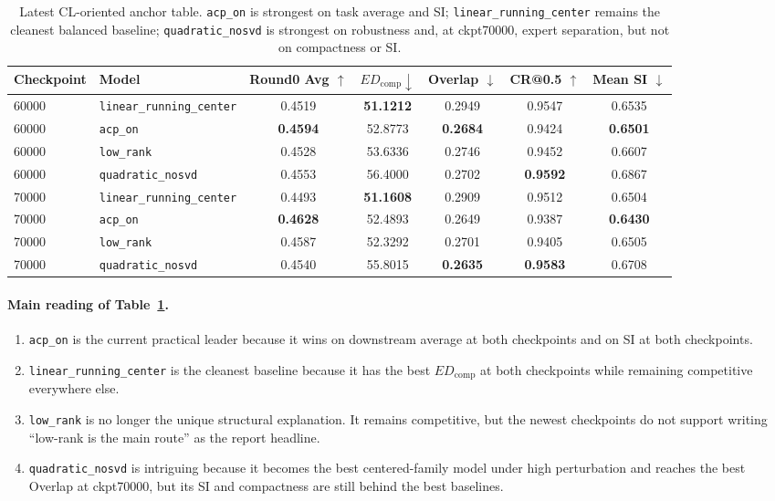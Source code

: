 \documentclass[11pt]{article}
\newcommand{\tablesize}{\footnotesize}
\begin{document}
\begin{table}[H]
\centering
\tablesize
\begin{adjustbox}{max width=\linewidth}
\begin{tabular}{llccccc}
\toprule
Checkpoint & Model & Round0 Avg $\uparrow$ & $ED_{\mathrm{comp}} \downarrow$ & Overlap $\downarrow$ & CR@0.5 $\uparrow$ & Mean SI $\downarrow$ \\
\midrule
60000 & \texttt{linear\_running\_center} & 0.4519 & \textbf{51.1212} & 0.2949 & 0.9547 & 0.6535 \\
60000 & \texttt{acp\_on} & \textbf{0.4594} & 52.8773 & \textbf{0.2684} & 0.9424 & \textbf{0.6501} \\
60000 & \texttt{low\_rank} & 0.4528 & 53.6336 & 0.2746 & 0.9452 & 0.6607 \\
60000 & \texttt{quadratic\_nosvd} & 0.4553 & 56.4000 & 0.2702 & \textbf{0.9592} & 0.6867 \\
\midrule
70000 & \texttt{linear\_running\_center} & 0.4493 & \textbf{51.1608} & 0.2909 & 0.9512 & 0.6504 \\
70000 & \texttt{acp\_on} & \textbf{0.4628} & 52.4893 & 0.2649 & 0.9387 & \textbf{0.6430} \\
70000 & \texttt{low\_rank} & 0.4587 & 52.3292 & 0.2701 & 0.9405 & 0.6505 \\
70000 & \texttt{quadratic\_nosvd} & 0.4540 & 55.8015 & \textbf{0.2635} & \textbf{0.9583} & 0.6708 \\
\bottomrule
\end{tabular}
\end{adjustbox}
\caption{Latest CL-oriented anchor table. \texttt{acp\_on} is strongest on task average and SI; \texttt{linear\_running\_center} remains the cleanest balanced baseline; \texttt{quadratic\_nosvd} is strongest on robustness and, at ckpt70000, expert separation, but not on compactness or SI.}
\label{tab:latest-anchor}
\end{table}

\paragraph{Main reading of Table~\ref{tab:latest-anchor}.}
\begin{enumerate}
    \item \texttt{acp\_on} is the current practical leader because it wins on downstream average at both checkpoints and on SI at both checkpoints.
    \item \texttt{linear\_running\_center} is the cleanest baseline because it has the best $ED_{\mathrm{comp}}$ at both checkpoints while remaining competitive everywhere else.
    \item \texttt{low\_rank} is no longer the unique structural explanation. It remains competitive, but the newest checkpoints do not support writing ``low-rank is the main route'' as the report headline.
    \item \texttt{quadratic\_nosvd} is intriguing because it becomes the best centered-family model under high perturbation and reaches the best Overlap at ckpt70000, but its SI and compactness are still behind the best baselines.
\end{enumerate}
\end{document}
